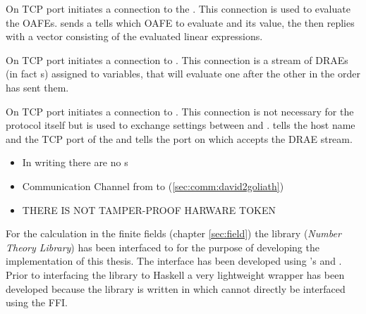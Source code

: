 \label{sec:comm:david2token}

On TCP port  \JWpTwo{} initiates a connection to the \JWtoken{}.
This connection is used to evaluate the OAFEs. \JWpTwo{} sends a tells which
OAFE to evaluate and its value, the \JWtoken{} then replies with a vector
consisting of the evaluated linear expressions.


\label{sec:comm:goliath2david}

On TCP port  \JWpOne{} initiates a connection to \JWpTwo{}. This
connection is a stream of \JWpTwo{} DRAEs (in fact s) assigned to
variables, that \JWpTwo{} will evaluate one after the other in the order
\JWpOne{} has sent them.


\label{sec:comm:david2goliath}

On TCP port  \JWpTwo{} initiates a connection to \JWpOne{}. This
connection is not necessary for the protocol itself but is used to exchange
settings between \JWpOne{} and \JWpTwo{}. \JWpOne{} tells \JWpTwo{} the host
name and the TCP port of the \JWtoken{} and \JWpTwo{} tells \JWpOne{} the port
on which \JWpTwo{} accepts the DRAE stream.


%
%
\label{sec:implementation-differences}

\begin{itemize}

\item In writing there are no s

\item Communication Channel from \JWpTwo{} to \JWpOne{}
(\ref{sec:comm:david2goliath})

\item THERE IS NOT TAMPER-PROOF HARWARE TOKEN

\end{itemize}


%
%
\label{sec:implementation-details}

\label{sec:finite-field-calcs}

For the calculation in the finite fields (chapter \ref{sec:field}) the
\JWTcpp{} library \JWTLntl{} (\emph{Number Theory Library}) has been interfaced
to \JWThaskell{} for the purpose of developing the implementation of this
thesis. The interface has been developed using \JWThaskell{}'s  \cite{haskell2010} and  \cite{c2hs}. Prior to interfacing the library to Haskell a very
lightweight \JWTc{} wrapper has been developed because the library is written in
\JWTcpp{} which cannot directly be interfaced using the FFI.

